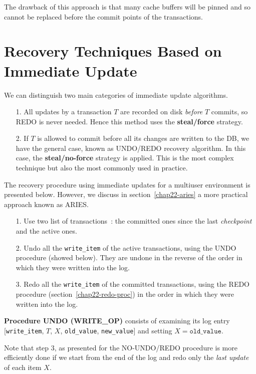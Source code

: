 The drawback of this approach is that many cache buffers will be pinned and so cannot be replaced before the commit points of the transactions.



\section{Recovery Techniques Based on Immediate Update}
\label{chap22-immediate}
We can distinguish two main categories of immediate update algorithms. \\

\begin{itemize}
    \item[1.] All updates by a transaction $T$ are recorded on disk \textit{before} $T$ commits, so REDO is never needed. Hence this method uses the \textbf{steal/force} strategy.
    \item[2.] If $T$ is allowed to commit before all its changes are written to the DB, we have the general case, known as UNDO/REDO recovery algorithm. In this case, the \textbf{steal/no-force} strategy is applied. This is the most complex technique but also the most commonly used in practice.
\end{itemize}

The recovery procedure using immediate updates for a multiuser environment is presented below. However, we discuss in section~\ref{chap22-aries} a more practical approach known as ARIES.

\begin{itemize}
    \item[1.] Use two list of transactions~: the committed ones since the last \textit{checkpoint} and the active ones.
    \item[2.] Undo all the \texttt{write\_item} of the active transactions, using the UNDO procedure (showed below). They are undone in the reverse of the order in which they were written into the log.
    \item[3.] Redo all the \texttt{write\_item} of the committed transactions, using the REDO procedure (section~\ref{chap22-redo-proc}) in the order in which they were written into the log. 
\end{itemize}

\textbf{Procedure UNDO (WRITE\_OP)} consists of examining its log entry [\texttt{write\_item}, $T$, $X$, \texttt{old\_value}, \texttt{new\_value}] and setting $X=\texttt{old\_value}$.

Note that step 3, as presented for the NO-UNDO/REDO procedure is more efficiently done if we start from the end of the log and redo only the \textit{last update} of each item $X$.



